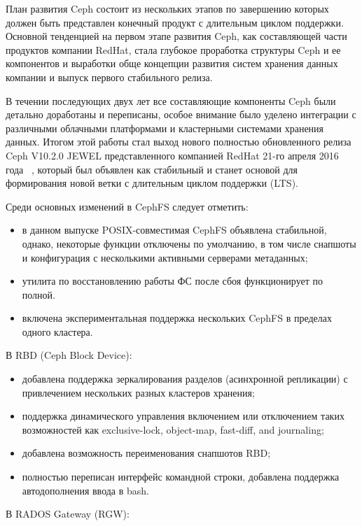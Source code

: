 \documentclass[10pt, a5paper]{article}
\begin{document}
План развития Ceph состоит из нескольких этапов по завершению которых должен быть представлен конечный продукт с длительным циклом поддержки. Основной тенденцией на первом этапе развития Ceph, как составляющей части продуктов компании RedHat, стала глубокое проработка структуры Ceph и ее компонентов и выработки обще концепции развития систем хранения данных компании и выпуск первого стабильного релиза.

В течении последующих двух лет  все составляющие компоненты Ceph были детально доработаны и переписаны, особое внимание было уделено интеграции с различными облачными платформами и кластерными системами хранения данных.  Итогом этой работы  стал выход нового полностью обновленного релиза Ceph V10.2.0 JEWEL представленного компанией RedHat 21-го апреля 2016 года ~\cite{Kliga5}, который был объявлен как стабильный и станет основой для  формирования новой ветки с длительным циклом поддержки (LTS).

Среди основных изменений в CephFS следует отметить:

\begin{itemize}
  \item в данном выпуске POSIX-совместимая CephFS объявлена стабильной, однако, некоторые функции отключены по умолчанию, в том числе снапшоты и конфигурация с несколькими активными серверами метаданных;
  \item утилита по восстановлению работы ФС после сбоя функционирует по полной.
  \item включена экспериментальная поддержка нескольких CephFS в пределах одного кластера.
\end{itemize}

В RBD (Ceph Block Device):

\begin{itemize}
  \item добавлена поддержка зеркалирования разделов (асинхронной репликации) с привлечением нескольких разных кластеров хранения;
  \item поддержка динамического управления включением или отключением таких возможностей как exclusive-lock, object-map, fast-diff, and journaling;
  \item добавлена возможность переименования снапшотов RBD;
  \item полностью переписан интерфейс командной строки, добавлена поддержка автодополнения ввода в bash.
\end{itemize}

В RADOS Gateway (RGW):
\end{document}

